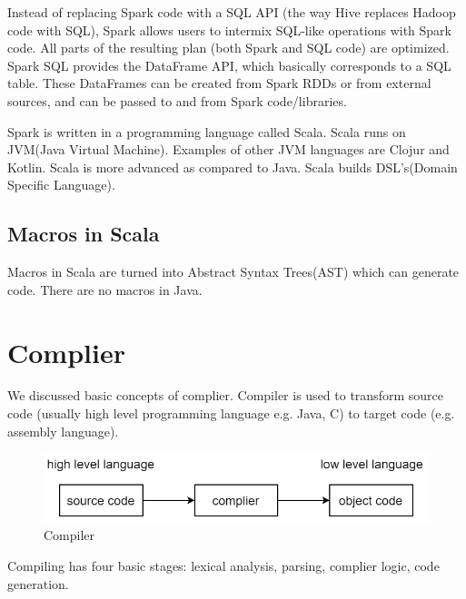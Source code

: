 \documentclass[twoside]{article}
\begin{document}
Instead of replacing Spark code with a SQL API (the way Hive replaces Hadoop code with SQL),  Spark allows users to intermix SQL-like operations with Spark code. All parts of the resulting plan (both Spark and SQL code) are optimized. Spark SQL provides the DataFrame API, which basically corresponds to a SQL table. These DataFrames can be created from Spark RDDs or from external sources, and can be passed to and from Spark code/libraries.

Spark is written in a programming language called Scala. Scala runs on JVM(Java Virtual Machine). Examples of other JVM languages are Clojur and Kotlin. Scala is more advanced as compared to Java. Scala builds DSL's(Domain Specific Language).



\subsection{Macros in Scala}

Macros in Scala are turned into Abstract Syntax Trees(AST) which can generate code. There are no macros in Java.

\section{Complier}

We discussed basic concepts of complier. Compiler is used to transform source code (usually high level programming language e.g. Java, C) to target code (e.g. assembly language).

\begin{figure}[h]
\centering
\includegraphics[scale=0.35]{compiler.png}
\caption{Compiler}
\end{figure}

Compiling has four basic stages: lexical analysis, parsing, complier logic, code generation. 
\end{document}
